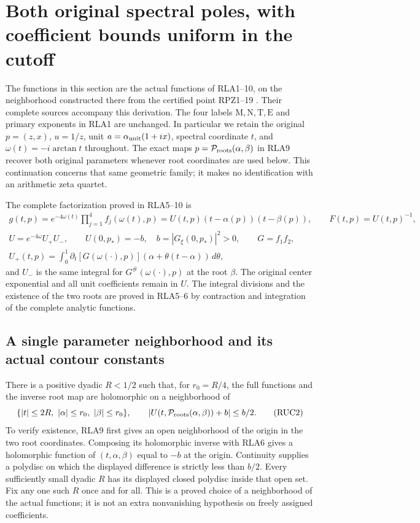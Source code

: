 \documentclass[11pt]{article}
\begin{document}
\section{Both original spectral poles, with coefficient bounds uniform in the cutoff}
\label{sec:real-pair-uniform-coefficients}

The functions in this section are the actual functions of RLA1--10,
on the neighborhood constructed there from the certified point
RPZ1--19 \cite{RPZ005}.  Their complete sources accompany this
derivation.  The four labels $\mathrm M,\mathrm N,\mathrm T,\mathrm E$
and primary exponents in RLA1 are unchanged.  In particular we retain
the original $p=(z,x)$, $u=1/z$, unit
$a=\alpha_{\rm unit}(1+ix)$, spectral coordinate $t$, and
$\omega(t)=-i\arctan t$ throughout.  The exact maps
$p=\mathcal P_{\rm roots}(\alpha,\beta)$ in RLA9 recover both
original parameters whenever root coordinates are used below.
This continuation concerns that same geometric family; it makes no
identification with an arithmetic zeta quartet.

The complete factorization proved in RLA5--10 is
\[
 \begin{gathered}
 g(t,p)=e^{-4\omega(t)}\prod_{j=1}^4 f_j(\omega(t),p)
       =U(t,p)(t-\alpha(p))(t-\beta(p)),\qquad F(t,p)=U(t,p)^{-1},\\
 U=e^{-4\omega}U_+U_-,\qquad U(0,p_*)=-b,\quad
 b=|G_\xi(0,p_*)|^2>0,\qquad G=f_1f_2,\\
 U_+(t,p)=\int_0^1\partial_t[G(\omega(\cdot),p)]
        (\alpha+\theta(t-\alpha))\,d\theta,
 \end{gathered}\tag{RUC1}
\]
and $U_-$ is the same integral for $G^\#(\omega(\cdot),p)$ at
the root $\beta$.  The original center exponential and all unit
coefficients remain in $U$.  The integral divisions and the
existence of the two roots are proved in RLA5--6 by contraction
and integration of the complete analytic functions.

\subsection{A single parameter neighborhood and its actual contour constants}

There is a positive dyadic $R<1/2$ such that, for
$r_0=R/4$, the full functions and the inverse root map are
holomorphic on a neighborhood of
\[
 \{|t|\le2R,\ |\alpha|\le r_0,\ |\beta|\le r_0\},\qquad
 |U(t,\mathcal P_{\rm roots}(\alpha,\beta))+b|\le b/2.
 \tag{RUC2}
\]
To verify existence, RLA9 first gives an open neighborhood of the
origin in the two root coordinates.  Composing its holomorphic
inverse with RLA6 gives a holomorphic function of $(t,\alpha,\beta)$
equal to $-b$ at the origin.  Continuity supplies a polydisc on
which the displayed difference is strictly less than $b/2$.
Every sufficiently small dyadic $R$ has its displayed closed
polydisc inside that open set.  Fix any one such $R$ once and
for all.  This is a proved choice of a neighborhood of the actual
functions; it is not an extra nonvanishing hypothesis on freely
assigned coefficients.
\end{document}
